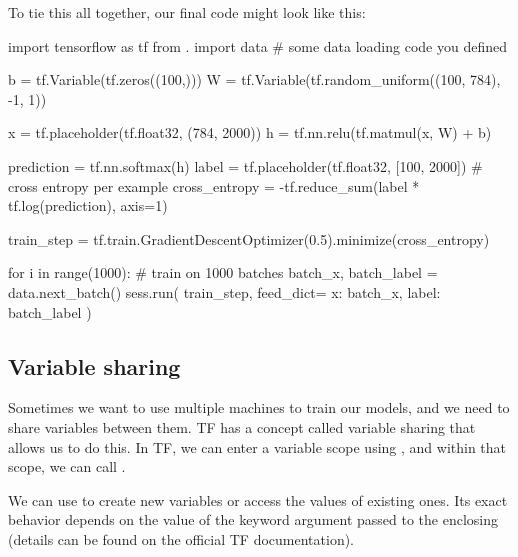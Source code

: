 To tie this all together, our final code might look like this:
\begin{python}
import tensorflow as tf
from . import data  # some data loading code you defined

b = tf.Variable(tf.zeros((100,)))
W = tf.Variable(tf.random_uniform((100, 784), -1, 1))

x = tf.placeholder(tf.float32, (784, 2000))
h = tf.nn.relu(tf.matmul(x, W) + b)

prediction = tf.nn.softmax(h)
label = tf.placeholder(tf.float32, [100, 2000])
# cross entropy per example
cross_entropy = -tf.reduce_sum(label * tf.log(prediction), axis=1)

train_step = tf.train.GradientDescentOptimizer(0.5).minimize(cross_entropy)

for i in range(1000):  # train on 1000 batches
    batch_x, batch_label = data.next_batch()
    sess.run(
        train_step, 
        feed_dict={
            x: batch_x,
            label: batch_label
        }
    )
\end{python}

\subsection{Variable sharing}
Sometimes we want to use multiple machines to train our models, and we need to share variables between them. TF has a concept called variable sharing that allows us to do this. In TF, we can enter a variable scope using , and within that scope, we can call .

We can use  to create new variables or access the values of existing ones. Its exact behavior depends on the value of the  keyword argument passed to the enclosing  (details can be found on the official TF documentation).
